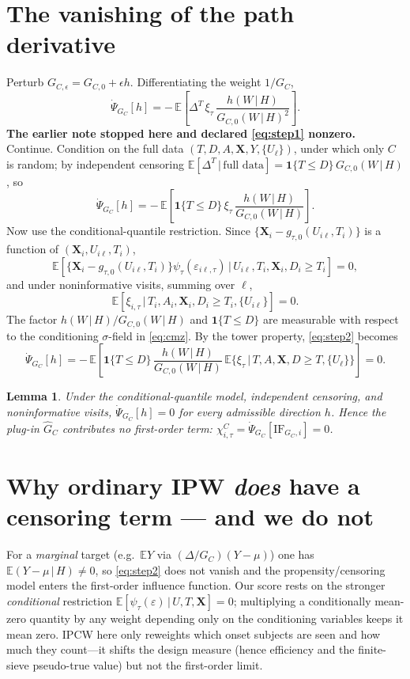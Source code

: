 \documentclass[11pt]{article}
\newtheorem{lemma}{Lemma}
\newcommand{\E}{\mathbb{E}}
\newcommand{\X}{\bm{X}}
\newcommand{\indc}[1]{\mathbf{1}\{#1\}}
\newcommand{\given}{\,\vert\,}
\begin{document}
\section{The vanishing of the path derivative}
Perturb $G_{C,\epsilon}=G_{C,0}+\epsilon h$. Differentiating the weight
$1/G_C$,
\begin{equation}
\dot\Psi_{G_C}[h]
=-\,\E\!\left[\Delta^T\,\xi_\tau\,
   \frac{h(W\given H)}{G_{C,0}(W\given H)^2}\right].
\label{eq:step1}
\end{equation}
\textbf{The earlier note stopped here and declared \eqref{eq:step1} nonzero.}
Continue. Condition on the full data $(T,D,A,\X,Y,\{U_\ell\})$, under which only
$C$ is random; by independent censoring
$\E[\Delta^T\given\text{full data}]=\indc{T\le D}\,G_{C,0}(W\given H)$, so
\begin{equation}
\dot\Psi_{G_C}[h]
=-\,\E\!\left[\indc{T\le D}\,\xi_\tau\,
   \frac{h(W\given H)}{G_{C,0}(W\given H)}\right].
\label{eq:step2}
\end{equation}
Now use the conditional-quantile restriction. Since
$\{\X_i-g_{\tau,0}(U_{i\ell},T_i)\}$ is a function of $(\X_i,U_{i\ell},T_i)$,
\[
\E[\{\X_i-g_{\tau,0}(U_{i\ell},T_i)\}\psi_\tau(\varepsilon_{i\ell,\tau})
   \given U_{i\ell},T_i,\X_i,D_i\ge T_i]=0,
\]
and under noninformative visits, summing over $\ell$,
\begin{equation}
\E[\xi_{i,\tau}\given T_i,A_i,\X_i,D_i\ge T_i,\{U_{i\ell}\}]=0.
\label{eq:cmz}
\end{equation}
The factor $h(W\given H)/G_{C,0}(W\given H)$ and $\indc{T\le D}$ are measurable
with respect to the conditioning $\sigma$-field in \eqref{eq:cmz}. By the tower
property, \eqref{eq:step2} becomes
\[
\dot\Psi_{G_C}[h]
=-\,\E\!\left[\indc{T\le D}\,\frac{h(W\given H)}{G_{C,0}(W\given H)}\,
   \E\{\xi_\tau\given T,A,\X,D\ge T,\{U_\ell\}\}\right]=0.
\]
\begin{lemma}\label{lem:orth}
Under the conditional-quantile model, independent censoring, and noninformative
visits, $\dot\Psi_{G_C}[h]=0$ for every admissible direction $h$. Hence the
plug-in $\widehat G_C$ contributes no first-order term:
$\chi^C_{i,\tau}=\dot\Psi_{G_C}[\mathrm{IF}_{G_C,i}]=0$.
\end{lemma}

\section{Why ordinary IPW \emph{does} have a censoring term --- and we do not}
For a \emph{marginal} target (e.g.\ $\E Y$ via $(\Delta/G_C)(Y-\mu)$) one has
$\E(Y-\mu\given H)\neq0$, so \eqref{eq:step2} does not vanish and the
propensity/censoring model enters the first-order influence function. Our score
rests on the stronger \emph{conditional} restriction
$\E[\psi_\tau(\varepsilon)\given U,T,\X]=0$; multiplying a conditionally
mean-zero quantity by any weight depending only on the conditioning variables
keeps it mean zero. IPCW here only reweights which onset subjects are seen and
how much they count---it shifts the design measure (hence efficiency and the
finite-sieve pseudo-true value) but not the first-order limit.
\end{document}
